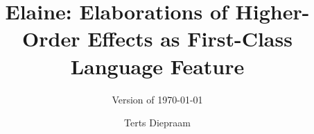 \title{Elaine: Elaborations of Higher-Order Effects as First-Class Language Feature}
\subtitle{Version of \today}
\author{Terts Diepraam}
